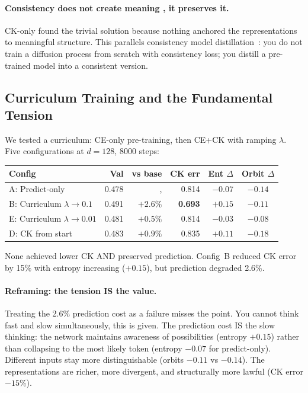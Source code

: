 \documentclass[11pt, a4paper]{article}
\theoremstyle{plain}
\theoremstyle{definition}
\theoremstyle{remark}
\begin{document}
\paragraph{Consistency does not create meaning ,  it preserves it.}
CK-only found the trivial solution because nothing anchored the representations to meaningful structure.
This parallels consistency model distillation~\cite{song2023consistency}: you do not train a diffusion process from scratch with consistency loss; you distill a pre-trained model into a consistent version.

\subsection{Curriculum Training and the Fundamental Tension}

We tested a curriculum: CE-only pre-training, then CE+CK with ramping $\lambda$.
Five configurations at $d{=}128$, 8000 steps:

\begin{center}\small
\begin{tabular}{@{}lrrrrc@{}}
\toprule
\textbf{Config} & \textbf{Val} & \textbf{vs base} & \textbf{CK err} & \textbf{Ent $\Delta$} & \textbf{Orbit $\Delta$} \\
\midrule
A: Predict-only & 0.478 & ,  & 0.814 & $-0.07$ & $-0.14$ \\
B: Curriculum $\lambda{\to}0.1$ & 0.491 & $+2.6\%$ & \textbf{0.693} & $\mathbf{+0.15}$ & $-0.11$ \\
E: Curriculum $\lambda{\to}0.01$ & 0.481 & $+0.5\%$ & 0.814 & $-0.03$ & $-0.08$ \\
D: CK from start & 0.483 & $+0.9\%$ & 0.835 & $+0.11$ & $-0.18$ \\
\bottomrule
\end{tabular}
\end{center}

None achieved lower CK AND preserved prediction.
Config~B reduced CK error by 15\% with entropy increasing ($+0.15$), but prediction degraded 2.6\%.

\paragraph{Reframing: the tension IS the value.}
Treating the 2.6\% prediction cost as a failure misses the point.
You cannot think fast and slow simultaneously, this is given.
The prediction cost IS the slow thinking: the network maintains awareness of possibilities (entropy $+0.15$) rather than collapsing to the most likely token (entropy $-0.07$ for predict-only).
Different inputs stay more distinguishable (orbits $-0.11$ vs $-0.14$).
The representations are richer, more divergent, and structurally more lawful (CK error $-15\%$).
\end{document}
